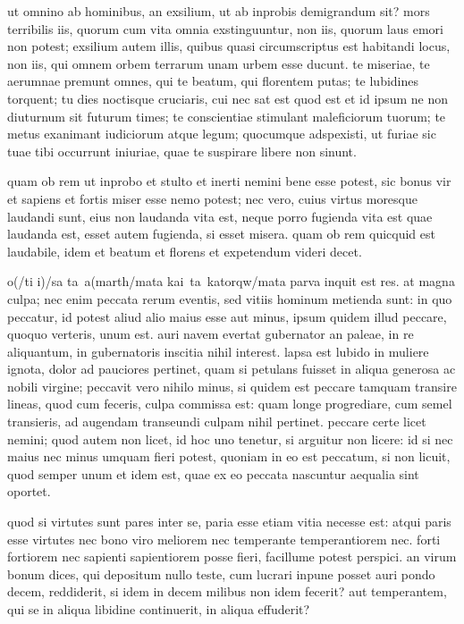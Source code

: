  ut omnino ab hominibus, an exsilium, ut ab inprobis demigrandum sit? mors terribilis iis, quorum cum vita omnia exstinguuntur, non iis, quorum laus emori non potest; exsilium autem illis, quibus quasi circumscriptus est habitandi locus, non iis, qui omnem orbem terrarum unam urbem esse ducunt. te miseriae, te aerumnae premunt omnes, qui te beatum, qui florentem putas; te lubidines torquent; tu dies noctisque cruciaris, cui nec sat est quod est et id ipsum ne non diuturnum sit futurum times; te conscientiae stimulant maleficiorum tuorum; te metus exanimant iudiciorum atque legum; quocumque adspexisti, ut furiae sic tuae tibi occurrunt iniuriae, quae te suspirare libere non sinunt.

 quam ob rem ut inprobo et stulto et inerti nemini bene esse potest, sic bonus vir et sapiens et fortis miser esse nemo potest; nec vero, cuius virtus moresque laudandi sunt, eius non laudanda vita est, neque porro fugienda vita est quae laudanda est, esset autem fugienda, si esset misera. quam ob rem quicquid est laudabile, idem et beatum et florens et expetendum videri decet.

 o(/ti i)/sa ta\ a(marth/mata kai\ ta\ katorqw/mata parva inquit est res. at magna culpa; nec enim peccata rerum eventis, sed vitiis hominum metienda sunt: in quo peccatur, id potest aliud alio maius esse aut minus, ipsum quidem illud peccare, quoquo verteris, unum est. auri navem evertat gubernator an paleae, in re aliquantum, in gubernatoris inscitia nihil interest. lapsa est lubido in muliere ignota, dolor ad pauciores pertinet, quam si petulans fuisset in aliqua generosa ac nobili virgine; peccavit vero nihilo minus, si quidem est peccare tamquam transire lineas, quod cum feceris, culpa commissa est: quam longe progrediare, cum semel transieris, ad augendam transeundi culpam nihil pertinet. peccare certe licet nemini; quod autem non licet, id hoc uno tenetur, si arguitur non licere: id si nec maius nec minus umquam fieri potest, quoniam in eo est peccatum, si non licuit, quod semper unum et idem est, quae ex eo peccata nascuntur aequalia sint oportet.

 quod si virtutes sunt pares inter se, paria esse etiam vitia necesse est: atqui paris esse virtutes nec bono viro meliorem nec temperante temperantiorem nec. forti fortiorem nec sapienti sapientiorem posse fieri, facillume potest perspici. an virum bonum dices, qui depositum nullo teste, cum lucrari inpune posset auri pondo decem, reddiderit, si idem in decem milibus non idem fecerit? aut temperantem, qui se in aliqua libidine continuerit, in aliqua effuderit?

